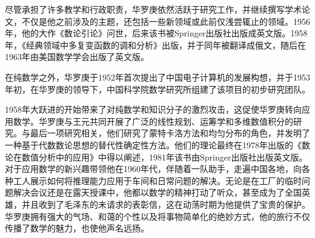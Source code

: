 尽管承担了许多教学和行政职责，华罗庚依然活跃于研究工作，并继续撰写学术论文，不仅是他之前涉及的主题，还包括一些新领域或此前仅浅尝辄止的领域。1956年，他的大作《数论引论》问世，后来该书被Springer出版社出版成英文版。1958年，《经典领域中多复变函数的调和分析》出版，并于同年被翻译成俄文，随后在1963年由美国数学学会出版了英文版。

在纯数学之外，华罗庚于1952年首次提出了中国电子计算机的发展构想，并于1953年初，在华罗庚的领导下，中国科学院数学研究所组建了该项目的初步研究团队。

1958年大跃进的开始带来了对纯数学和知识分子的激烈攻击，这促使华罗庚转向应用数学。华罗庚与王元共同开展了广泛的线性规划、运筹学和多维数值积分的研究。与最后一项研究相关，他们研究了蒙特卡洛方法和均匀分布的角色，并发明了一种基于代数数论思想的替代性确定性方法。他们的理论最终在1978年出版的《数论在数值分析中的应用》中得以阐述，1981年该书由Springer出版社出版英文版。对于应用数学的新兴趣带领他在1960年代，伴随着一队助手，走遍中国各地，向各种工人展示如何将推理能力应用于车间和日常问题的解决。无论是在工厂的临时问题解决会议还是在露天授课中，他都以数学的精神打动了听众，甚至成为了全国英雄，并且收到了毛泽东的未请求的表彰信，这在动荡时期为他提供了宝贵的保护。华罗庚拥有强大的气场、和蔼的个性以及将事物简单化的绝妙方式，他的旅行不仅传播了数学的魅力，也使他声名远扬。

